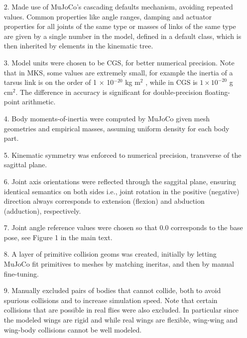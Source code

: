 \documentclass[sn-mathphys-num]{sn-jnl}%
\theoremstyle{thmstyleone}%
\theoremstyle{thmstyletwo}%
\theoremstyle{thmstylethree}%
\begin{document}
\begin{appendices}
\begin{itemize}
	\item[2.] 
	Made use of MuJoCo's cascading defaults mechanism, avoiding repeated values. 
	Common properties like angle ranges, damping and actuator properties for all joints of the same type or masses of links of the same type are given by a single number in the model, defined in a default class, which is then inherited by elements in the kinematic tree.
	
	\item[3.] 
	Model units were chosen to be CGS, for better numerical precision. 
	Note that in MKS, some values are extremely small, for example the inertia of a tarsus link is on the order of 1 × 10$ ^{-20} $ kg m$ ^2 $ , while in CGS is $1 \times 10 ^{-20} $ g cm$ ^2 $. 
	The difference in accuracy is significant for double-precision floating-point arithmetic.
	
	
	\item[4.] 
	Body moments-of-inertia were computed by MuJoCo given mesh geometries and empirical masses, assuming uniform density for each body part.
	
	
	\item[5. ] 
	Kinematic symmetry was enforced to numerical precision, transverse of the sagittal plane.
	
	
	\item[6.] 
	Joint axis orientations were reflected through the saggital plane, ensuring identical semantics on both sides i.e., joint rotation in the positive (negative) direction always corresponds to extension (flexion) and abduction (adduction), respectively.
	
	
	\item[7.] 
	Joint angle reference values were chosen so that 0.0 corresponds to the base pose, see Figure 1 in the main text.
	
	
	\item[8.] 
	A layer of primitive collision geoms was created, initially by letting MuJoCo fit primitives to meshes by matching ineritas, and then by manual fine-tuning.
	
	
	\item[9.] 
	Manually excluded pairs of bodies that cannot collide, both to avoid spurious collisions and to increase simulation speed. 
	Note that certain collisions that are possible in real flies were also excluded. 
	In particular since the modeled wings are rigid and while real wings are flexible, wing-wing and wing-body collisions cannot be well modeled.
	

\end{itemize}
\end{appendices}
\end{document}
